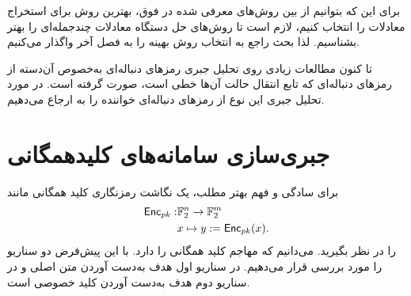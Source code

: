 برای این که بتوانیم از بین روش‌های معرفی شده در فوق، بهترین روش برای استخراج معادلات را انتخاب کنیم، لازم است تا روش‌های حل دستگاه معادلات چندجمله‌ای را بهتر بشناسیم. لذا بحث راجع به انتخاب روش بهینه را به فصل آخر واگذار می‌کنیم. 


تا کنون مطالعات زیادی روی تحلیل جبری رمزهای دنباله‌ای به‌خصوص آن‌دسته از رمزهای دنباله‌ای که تابع انتقال حالت آن‌ها خطی است، صورت گرفته است. در مورد تحلیل جبری این نوع از رمزهای دنباله‌ای خواننده را به
\cite{courtois2003fast,hawkes2004rewriting,courtois2003algebraic}
ارجاع می‌دهیم.

\section{جبری‌سازی سامانه‌های کلید‌همگانی}
برای سادگی و فهم بهتر مطلب، یک نگاشت رمزنگاری کلید همگانی مانند
\begin{align*}
\mathsf{Enc}_{pk}:&\mathbb{F}_{2}^{n}\rightarrow\mathbb{F}_{2}^{m}\\
 &x\mapsto y:=\mathsf{Enc}_{pk}(x).
\end{align*}
را در نظر بگیرید. می‌دانیم که مهاجم کلید همگانی را دارد. با این پیش‌فرض دو سناریو را مورد بررسی قرار می‌دهیم. در سناریو اول هدف به‌دست آوردن متن اصلی و در سناریو دوم هدف به‌دست آوردن کلید خصوصی است. 
